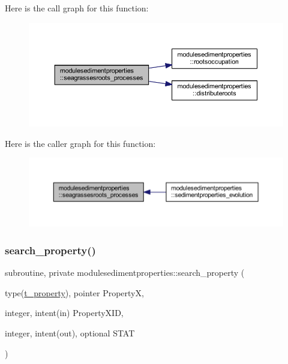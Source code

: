 Here is the call graph for this function\+:\nopagebreak
\begin{figure}[H]
\begin{center}
\leavevmode
\includegraphics[width=350pt]{namespacemodulesedimentproperties_abe11ce25dab5cf7abc26eeb1fb7fdcd9_cgraph}
\end{center}
\end{figure}
Here is the caller graph for this function\+:\nopagebreak
\begin{figure}[H]
\begin{center}
\leavevmode
\includegraphics[width=350pt]{namespacemodulesedimentproperties_abe11ce25dab5cf7abc26eeb1fb7fdcd9_icgraph}
\end{center}
\end{figure}
\mbox{\label{namespacemodulesedimentproperties_a30718f70ea81a445eb986292b5c9cd5f}} 
\subsubsection{\texorpdfstring{search\+\_\+property()}{search\_property()}}
{\footnotesize\ttfamily subroutine, private modulesedimentproperties\+::search\+\_\+property (\begin{DoxyParamCaption}\item[{type(\mbox{\hyperlink{structmodulesedimentproperties_1_1t__property}{t\+\_\+property}}), pointer}]{PropertyX,  }\item[{integer, intent(in)}]{Property\+X\+ID,  }\item[{integer, intent(out), optional}]{S\+T\+AT }\end{DoxyParamCaption})\hspace{0.3cm}{\ttfamily [private]}}

